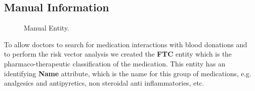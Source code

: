 %
%
%
%

\subsection{Manual Information}

\begin{figure}[h]
	\begin{center}
	\end{center}
	\caption{Manual Entity.}\label{fig:manual_entity}
\end{figure}

To allow doctors to search for medication interactions with blood donations and to perform the risk vector analysis we created the \textbf{FTC} entity which is the pharmaco-therapeutic classification of the medication.
This entity has an identifying \textbf{Name} attribute, which is the name for this group of medications, e.g. analgesics and antipyretics, non steroidal anti inflammatories, etc.

